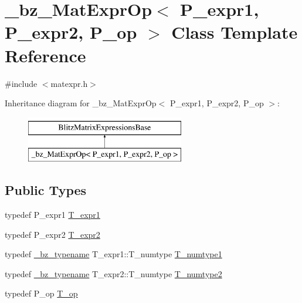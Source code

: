 \hypertarget{class__bz__MatExprOp}{}\section{\+\_\+bz\+\_\+\+Mat\+Expr\+Op$<$ P\+\_\+expr1, P\+\_\+expr2, P\+\_\+op $>$ Class Template Reference}
\label{class__bz__MatExprOp}


{\ttfamily \#include $<$matexpr.\+h$>$}

Inheritance diagram for \+\_\+bz\+\_\+\+Mat\+Expr\+Op$<$ P\+\_\+expr1, P\+\_\+expr2, P\+\_\+op $>$\+:\begin{figure}[H]
\begin{center}
\leavevmode
\includegraphics[height=2.000000cm]{class__bz__MatExprOp}
\end{center}
\end{figure}
\subsection*{Public Types}
\begin{DoxyCompactItemize}
\item 
typedef P\+\_\+expr1 \hyperlink{class__bz__MatExprOp_aef37d2e4d98a71279b12b241d8c067a0}{T\+\_\+expr1}
\item 
typedef P\+\_\+expr2 \hyperlink{class__bz__MatExprOp_ac564f43a14624f056bfc381f36d4e854}{T\+\_\+expr2}
\item 
typedef \hyperlink{compiler_8h_a1bc40add3e72effc9cf69dbe445cbdfd}{\+\_\+bz\+\_\+typename} T\+\_\+expr1\+::\+T\+\_\+numtype \hyperlink{class__bz__MatExprOp_a6a6a0f1736a11b0e5df0a11543191e5c}{T\+\_\+numtype1}
\item 
typedef \hyperlink{compiler_8h_a1bc40add3e72effc9cf69dbe445cbdfd}{\+\_\+bz\+\_\+typename} T\+\_\+expr2\+::\+T\+\_\+numtype \hyperlink{class__bz__MatExprOp_a377d342efc7b8a0f5626a9de9293b2c9}{T\+\_\+numtype2}
\item 
typedef P\+\_\+op \hyperlink{class__bz__MatExprOp_adf09ab505f7ad6afb77aa4c9fc50ef3e}{T\+\_\+op}
\end{DoxyCompactItemize}
